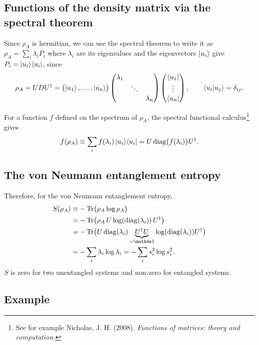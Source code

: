 \documentclass[../../main.tex]{subfiles}
\begin{document}
\subsection{Functions of the density matrix via the spectral theorem}

Since $\rho_A$ is hermitian, we can use the spectral theorem to write it as
$\rho_A=\sum_i\lambda_i P_i$ where $\lambda_i$ are its eigenvalues and the eigenvectors
$\left\lvert u_i \right\rangle$ give $P_i=\left\lvert u_i \right\rangle\!\left\langle u_i \right\rvert$, since
\begin{equation}
\rho_A=UDU^\dagger=\bigl(\left\lvert u_1 \right\rangle,\dots,\left\lvert u_n \right\rangle\bigr)
\begin{pmatrix}\lambda_1& &\\ &\ddots&\\ & &\lambda_n\end{pmatrix}
\begin{pmatrix}\left\langle u_1 \right\rvert\\\vdots\\\left\langle u_n \right\rvert\end{pmatrix},
\qquad\left\langle u_i \middle| u_j \right\rangle=\delta_{ij}.
\end{equation}


For a function $f$ defined on the spectrum of $\rho_A$, the spectral
functional calculus\footnote{See for example Nicholas, J. H. (2008). \emph{Functions of matrices: theory and computation.}} gives
\begin{equation}
f(\rho_A)\equiv\sum_i f(\lambda_i)\left\lvert u_i \right\rangle\!\left\langle u_i \right\rvert
=U\operatorname{diag}\bigl(f(\lambda_i)\bigr)U^\dagger.
\end{equation}

\subsection{The von Neumann entanglement entropy}

Therefore, for the von Neumann entanglement entropy,
\begin{align}
S(\rho_A)&\equiv-\Tr\bigl(\rho_A\log\rho_A\bigr) \\
&=-\Tr\bigl(\rho_A\,U\log(\diag(\lambda_i))\,U^\dagger\bigr)\notag\\
&=-\Tr\bigl(U\diag(\lambda_i)\underbrace{U^\dagger U}_{=\mathds 1}\log(\diag(\lambda_i))U^\dagger\bigr)\notag\\
&=-\sum_i\lambda_i\log\lambda_i
=-\sum_i s_i^2\log s_i^2.
\end{align}
$S$ is zero for two unentangled systems and non-zero for entangled systems.

\subsection{Example}
\end{document}
